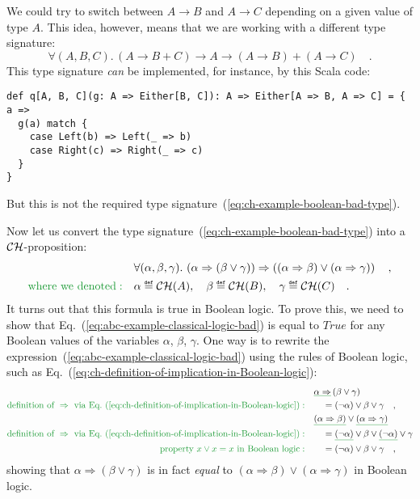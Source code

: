 We could try to switch between $A\rightarrow B$ and $A\rightarrow C$
depending on a given value of type $A$. This idea, however, means
that we are working with a different type signature: 
\[
\forall(A,B,C).\,\left(A\rightarrow B+C\right)\rightarrow A\rightarrow\left(A\rightarrow B\right)+\left(A\rightarrow C\right)\quad.
\]
This type signature \emph{can} be implemented, for instance, by this
Scala code:
\begin{lstlisting}
def q[A, B, C](g: A => Either[B, C]): A => Either[A => B, A => C] = { a =>
  g(a) match {
    case Left(b) => Left(_ => b)
    case Right(c) => Right(_ => c)
  }
}
\end{lstlisting}
But this is not the required type signature~(\ref{eq:ch-example-boolean-bad-type}).

Now let us convert the type signature~(\ref{eq:ch-example-boolean-bad-type})
into a ${\cal CH}$-proposition:
\begin{align}
 & \forall(\alpha,\beta,\gamma).\,\left(\alpha\Rightarrow\left(\beta\vee\gamma\right)\right)\Rightarrow\left(\left(\alpha\Rightarrow\beta\right)\vee\left(\alpha\Rightarrow\gamma\right)\right)\quad,\label{eq:abc-example-classical-logic-bad}\\
{\color{greenunder}\text{where we denoted}:}\quad & \alpha\triangleq{\cal CH}(A),\quad\beta\triangleq{\cal CH}(B),\quad\gamma\triangleq{\cal CH}(C)\quad.\nonumber 
\end{align}
It turns out that this formula is true in Boolean logic. To prove
this, we need to show that Eq.~(\ref{eq:abc-example-classical-logic-bad})
is equal to $True$ for any Boolean values of the variables $\alpha$,
$\beta$, $\gamma$. One way is to rewrite the expression~(\ref{eq:abc-example-classical-logic-bad})
using the rules of Boolean logic, such as Eq.~(\ref{eq:ch-definition-of-implication-in-Boolean-logic}):
\begin{align*}
 & \gunderline{\alpha\Rightarrow}\left(\beta\vee\gamma\right)\\
{\color{greenunder}\text{definition of }\Rightarrow\text{ via Eq.~(\ref{eq:ch-definition-of-implication-in-Boolean-logic})}:}\quad & \quad=(\neg\alpha)\vee\beta\vee\gamma\quad,\\
 & \gunderline{\left(\alpha\Rightarrow\beta\right)}\vee\gunderline{\left(\alpha\Rightarrow\gamma\right)}\\
{\color{greenunder}\text{definition of }\Rightarrow\text{ via Eq.~(\ref{eq:ch-definition-of-implication-in-Boolean-logic})}:}\quad & \quad=\gunderline{(\neg\alpha)}\vee\beta\vee\gunderline{(\neg\alpha)}\vee\gamma\\
{\color{greenunder}\text{property }x\vee x=x\text{ in Boolean logic}:}\quad & \quad=(\neg\alpha)\vee\beta\vee\gamma\quad,
\end{align*}
showing that $\alpha\Rightarrow(\beta\vee\gamma)$ is in fact \emph{equal}
to $\left(\alpha\Rightarrow\beta\right)\vee\left(\alpha\Rightarrow\gamma\right)$
in Boolean logic.


